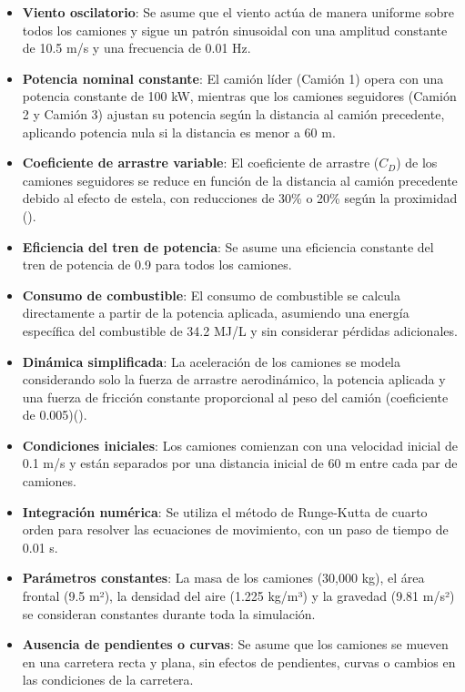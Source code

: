 \documentclass[11pt,stdletter,orderfromtodate,sigleft,twoside]{report}
\begin{document}
\begin{itemize}
    \item \textbf{Viento oscilatorio}: Se asume que el viento actúa de manera uniforme sobre todos los camiones y sigue un patrón sinusoidal con una amplitud constante de 10.5 m/s y una frecuencia de 0.01 Hz.
    \item \textbf{Potencia nominal constante}: El camión líder (Camión 1) opera con una potencia constante de 100 kW, mientras que los camiones seguidores (Camión 2 y Camión 3) ajustan su potencia según la distancia al camión precedente, aplicando potencia nula si la distancia es menor a 60 m.
    \item \textbf{Coeficiente de arrastre variable}: El coeficiente de arrastre ($C_D$) de los camiones seguidores se reduce en función de la distancia al camión precedente debido al efecto de estela, con reducciones de 30\% o 20\% según la proximidad (\cite{cdREduction}).
    \item \textbf{Eficiencia del tren de potencia}: Se asume una eficiencia constante del tren de potencia de 0.9 para todos los camiones.
    \item \textbf{Consumo de combustible}: El consumo de combustible se calcula directamente a partir de la potencia aplicada, asumiendo una energía específica del combustible de 34.2 MJ/L y sin considerar pérdidas adicionales.
    \item \textbf{Dinámica simplificada}: La aceleración de los camiones se modela considerando solo la fuerza de arrastre aerodinámico, la potencia aplicada y una fuerza de fricción constante proporcional al peso del camión (coeficiente de 0.005)(\cite{rodamiento}).
    \item \textbf{Condiciones iniciales}: Los camiones comienzan con una velocidad inicial de 0.1 m/s y están separados por una distancia inicial de 60 m entre cada par de camiones.
    \item \textbf{Integración numérica}: Se utiliza el método de Runge-Kutta de cuarto orden para resolver las ecuaciones de movimiento, con un paso de tiempo de 0.01 s.
    \item \textbf{Parámetros constantes}: La masa de los camiones (30,000 kg), el área frontal (9.5 m²), la densidad del aire (1.225 kg/m³) y la gravedad (9.81 m/s²) se consideran constantes durante toda la simulación.
    \item \textbf{Ausencia de pendientes o curvas}: Se asume que los camiones se mueven en una carretera recta y plana, sin efectos de pendientes, curvas o cambios en las condiciones de la carretera.
\end{itemize}
\end{document}
